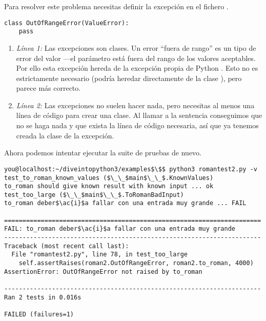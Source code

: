 Para resolver este problema necesitas definir la excepción  en el fichero .

\noindent\begin{minipage}{\textwidth}
\begin{lstlisting}[mathescape=True]
class OutOfRangeError(ValueError):
    pass
\end{lstlisting}
\end{minipage}

\begin{enumerate}

\item \emph{Línea 1:} Las excepciones son clases. Un error ``fuera de rango'' es un tipo de error del valor ---el parámetro está fuera del rango de los valores aceptables. Por ello esta excepción hereda de la excepción propia de Python . Esto no es estrictamente necesario (podría heredar directamente de la clase ), pero parece más correcto.

\item \emph{Línea 2:} Las excepciones no suelen hacer nada, pero necesitas al menos una línea de código para crear una clase. Al llamar a la sentencia  conseguimos que no se haga nada y que exista la línea de código necesaria, así que ya tenemos creada la clase de la excepción.

\end{enumerate}


Ahora podemos intentar ejecutar la suite de pruebas de nuevo.

\noindent\begin{minipage}{\textwidth}
\begin{lstlisting}[mathescape=True]
you@localhost:~/diveintopython3/examples$\$$ python3 romantest2.py -v
test_to_roman_known_values ($\_\_$main$\_\_$.KnownValues)
to_roman should give known result with known input ... ok
test_too_large ($\_\_$main$\_\_$.ToRomanBadInput)
to_roman deber$\ac{i}$a fallar con una entrada muy grande ... FAIL

======================================================================
FAIL: to_roman deber$\ac{i}$a fallar con una entrada muy grande
----------------------------------------------------------------------
Traceback (most recent call last):
  File "romantest2.py", line 78, in test_too_large
    self.assertRaises(roman2.OutOfRangeError, roman2.to_roman, 4000)
AssertionError: OutOfRangeError not raised by to_roman

----------------------------------------------------------------------
Ran 2 tests in 0.016s

FAILED (failures=1)
\end{lstlisting}
\end{minipage}

